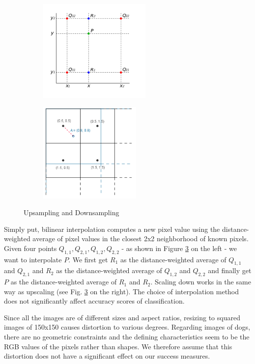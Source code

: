\documentclass[11pt,titlepage,oneside,openany]{article}
\begin{document}
\begin{figure}[h]
	\centering
	\begin{subfigure}[b]{5cm}
		\includegraphics[width=5.5cm]{bilinear_up}
		\label{fig:up}
	\end{subfigure}
	\qquad
	\begin{subfigure}[b]{5cm}
		\includegraphics[width=5cm]{bilinear_down}
		\label{fig:down}
	\end{subfigure}
	\caption{Upsampling \cite{wiki:interpolation} and Downsampling \cite{sampling}}
	\label{fig:samp}
\end{figure}

Simply put, bilinear interpolation computes a new pixel value using the distance-weighted average of pixel values in the closest 2x2 neighborhood of known pixels. Given four points $Q_{1,1}, Q_{2,1}, Q_{1,2}, Q_{2,2}$ - as shown in Figure \ref{fig:samp} on the left - we want to interpolate $P$. We first get $R_1$ as the distance-weighted average of $Q_{1,1}$ and $Q_{2,1}$ and $R_2$ as the distance-weighted average of $Q_{1,2}$ and $Q_{2,2}$ and finally get $P$ as the distance-weighted average of $R_1$ and $R_2$. Scaling down works in the same way as upscaling (see Fig. \ref{fig:samp} on the right). The choice of interpolation method does not significantly affect accuracy scores of classification. 

Since all the images are of different sizes and aspect ratios, resizing to squared images of 150x150 causes distortion to various degrees. Regarding images of dogs, there are no geometric constraints and the defining characteristics seem to be the RGB values of the pixels rather than shapes. We therefore assume that this distortion does not have a significant effect on our success measures.
\end{document}
